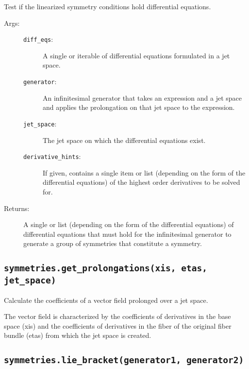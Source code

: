    Test if the linearized symmetry conditions hold differential
   equations.

   \begin{description}
      \item[Args:] \leavevmode
        \begin{description}
          \item[\lstinline{diff_eqs}:] A single or iterable of differential equations
            formulated in a jet space.

          \item[\lstinline{generator}:] An infinitesimal generator that takes an expression
            and a jet space and applies the prolongation on that jet
            space to the expression.

          \item[\lstinline{jet_space}:] The jet space on which the differential equations
            exist.

          \item[\lstinline{derivative_hints}:] If given, contains a single item or list
            (depending on the form of the differential equations) of the
            highest order derivatives to be solved for.
        \end{description}

      \item[Returns:]
        A single or list (depending on the form of the differential
        equations) of differential equations that must hold for the
        infinitesimal generator to generate a group of symmetries that
        constitute a symmetry.
   \end{description}

\subsection*{\lstinline{symmetries.get_prolongations(xis, etas, jet_space)}}

   Calculate the coefficients of a vector field prolonged over a jet
   space.

   The vector field is characterized by the coefficients of
   derivatives in the base space (xis) and the coefficients of
   derivatives in the fiber of the original fiber bundle (etas) from
   which the jet space is created.

\subsection*{\lstinline{symmetries.lie_bracket(generator1, generator2)}}

